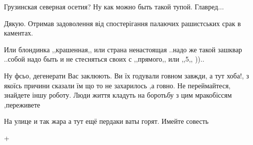 \begin{itemize}
 
Грузинская северная осетия? Ну как можно быть такой тупой. Главред...

 

Дякую. Отримав задоволення від спостерігання палаючих рашистських срак в каментах.

 
Или блондинка ,,крашенная,, или страна ненастоящая ..надо же такой зашквар ..собой надо быть и не стесняться своих с ,,прямого,, или ,,5,, ))..

 
Ну фсьо, дегенерати Вас заклюють. Ви їх годували говном завжди, а тут хоба!, з якоїсь причини сказали їм що то не захарилось ,а говно. Не переймайтеся, знайдете іншу роботу. Люди життя кладуть на боротьбу з цим мракобіссям ,переживете

 
На улице и так жара а тут ещё пердаки ваты горят. Имейте совесть

 
+

 

\end{itemize}
